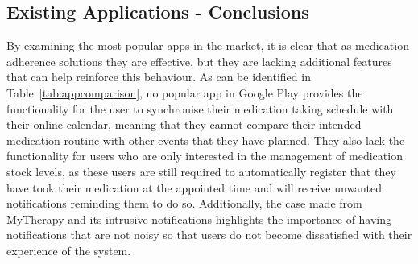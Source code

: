 \documentclass{l4proj}
\begin{document}
\subsection{Existing Applications - Conclusions}

By examining the most popular apps in the market, it is clear that as medication adherence solutions they are effective, but they are lacking additional features that can help reinforce this behaviour. As can be identified in Table~\ref{tab:appcomparison}, no popular app in Google Play provides the functionality for the user to synchronise their medication taking schedule with their online calendar, meaning that they cannot compare their intended medication routine with other events that they have planned. They also lack the functionality for users who are only interested in the management of medication stock levels, as these users are still required to automatically register that they have took their medication at the appointed time and will receive unwanted notifications reminding them to do so. Additionally, the case made from MyTherapy and its intrusive notifications highlights the importance of having notifications that are not noisy so that users do not become dissatisfied with their experience of the system.
\end{document}
